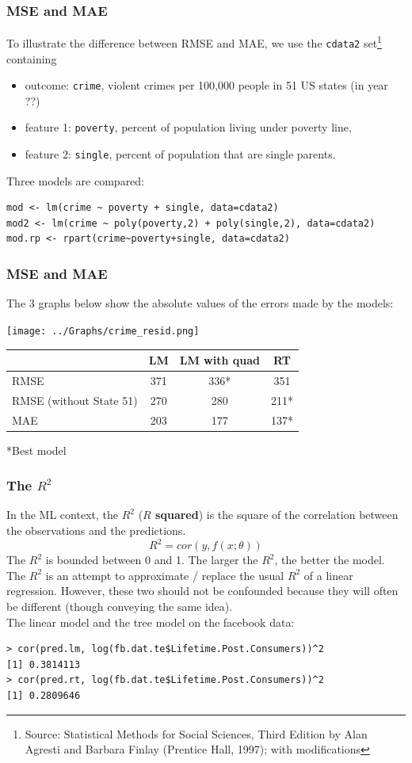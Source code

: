 \begin{frame}[fragile]
\frametitle{MSE and MAE}
To illustrate the difference between RMSE and MAE, we use the {\tt cdata2} set\footnote{Source: Statistical Methods for Social Sciences, Third Edition by Alan Agresti and Barbara Finlay (Prentice Hall, 1997); with modifications} containing 
\begin{itemize}
\item outcome: {\tt crime}, violent crimes per 100,000 people in 51 US states (in year ??)
\item feature 1: {\tt poverty}, percent of population living under poverty line, 
\item feature 2: {\tt single}, percent of population that are single parents.
\end{itemize}
Three models are compared:\\
\scriptsize 
\begin{verbatim}
mod <- lm(crime ~ poverty + single, data=cdata2)
mod2 <- lm(crime ~ poly(poverty,2) + poly(single,2), data=cdata2)
mod.rp <- rpart(crime~poverty+single, data=cdata2)
\end{verbatim}
\normalsize
\end{frame}
\begin{frame}
\frametitle{MSE and MAE}
The 3 graphs below show the absolute values of the errors made by the models:
\scriptsize
\begin{center}
\texttt{[image: ../Graphs/crime\_resid.png]}
\begin{tabular}{l | ccc}
& LM & LM with quad & RT \\
\hline
RMSE & 371 & 336* & 351 \\
RMSE (without State 51) & 270 & 280 & 211*\\
MAE & 203 & 177 & 137*\\
\hline
\end{tabular}
\end{center}
*Best model
\normalsize
\end{frame}
\begin{frame}[fragile]
\frametitle{The $R^2$}
In the ML context, the $R^2$ ({\bf $R$ squared}) is the square of the correlation between the observations and the predictions. 
$$
R^2 = cor(y,f(x;\theta))
$$
The $R^2$ is bounded between 0 and 1. The larger the $R^2$, the better the model.\\
\vspace{0.3cm}
The $R^2$ is an attempt to approximate / replace the usual $R^2$ of a linear regression. However, these two should not be confounded because they will often be different (though conveying the same idea).\\
\vspace{0.3cm}
The linear model and the tree model on the facebook data:
\scriptsize
\begin{verbatim}
> cor(pred.lm, log(fb.dat.te$Lifetime.Post.Consumers))^2
[1] 0.3814113
> cor(pred.rt, log(fb.dat.te$Lifetime.Post.Consumers))^2
[1] 0.2809646
\end{verbatim}
\normalsize
\end{frame}
